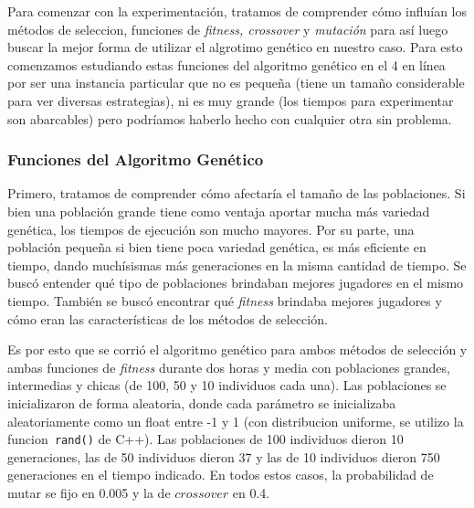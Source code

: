 \documentclass[A4paper,oneside,fleqn,11pt]{article}
\theoremstyle{definition}
\begin{document}
Para comenzar con la experimentación, tratamos de comprender cómo influían los métodos de seleccion, funciones de\textit{ fitness, crossover} y\textit{ mutación} para así luego buscar la mejor forma de utilizar el algrotimo genético en nuestro caso. Para esto comenzamos estudiando estas funciones del algoritmo genético en el 4 en línea por ser una instancia particular que no es pequeña (tiene un tamaño considerable para ver diversas estrategias), ni es muy grande (los tiempos para experimentar son abarcables) pero podríamos haberlo hecho con cualquier otra sin problema.


\subsubsection{Funciones del Algoritmo Genético}

Primero, tratamos de comprender cómo afectaría el tamaño de las poblaciones. Si bien una población grande tiene como ventaja aportar mucha más variedad genética, los tiempos de ejecución son mucho mayores. Por su parte, una población pequeña si bien tiene poca variedad genética, es más eficiente en tiempo, dando muchísismas más generaciones en la misma cantidad de tiempo. Se buscó entender qué tipo de poblaciones brindaban mejores jugadores en el mismo tiempo. También se buscó encontrar qué\textit{ fitness} brindaba mejores jugadores y cómo eran las características de los métodos de selección.

Es por esto que se corrió el algoritmo genético para ambos métodos de selección y ambas funciones de \textit{ fitness} durante dos horas y media con poblaciones grandes, intermedias y chicas (de 100, 50 y 10 individuos cada una). Las poblaciones se inicializaron de forma aleatoria, donde cada parámetro se inicializaba aleatoriamente como un float entre -1 y 1 (con distribucion uniforme, se utilizo la funcion\texttt{ rand()} de C++). Las poblaciones de 100 individuos dieron 10 generaciones, las de 50 individuos dieron 37 y las de 10 individuos dieron 750 generaciones en el tiempo indicado. En todos estos casos, la probabilidad de mutar se fijo en 0.005 y la de $crossover$ en 0.4.
\end{document}
